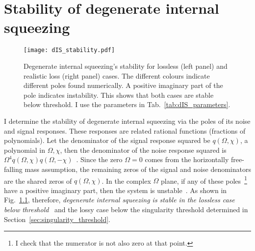 
\chapter{Stability of degenerate internal squeezing}
\label{app:dIS_stability}

\begin{figure}[ht]
    \centering
    \texttt{[image: dIS\_stability.pdf]}
    \caption{ Degenerate internal squeezing's stability for lossless (left panel) and realistic loss (right panel) cases. The different colours indicate different poles found numerically.
    A positive imaginary part of the pole indicates instability.
    This shows that both cases are stable below threshold. I use the parameters in Tab.~\ref{tab:dIS_parameters}.}
    \label{fig:dIS_stability}
\end{figure}

I determine the stability of degenerate internal squeezing via the poles of its noise and signal responses. These responses are related rational functions (fractions of polynomials). Let the denominator of the signal response squared be $q(\Omega,\chi)$, a polynomial in $\Omega,\chi$, then the denominator of the noise response squared is $\Omega^4 q(\Omega,\chi) q(\Omega,-\chi)$~\cite{korobkoQuantumExpanderGravitationalwave2019}. Since the zero $\Omega=0$ comes from the horizontally free-falling mass assumption, the remaining zeros of the signal and noise denominators are the shared zeros of $q(\Omega,\chi)$. In the complex $\Omega$ plane, if any of these poles~\footnote{I check that the numerator is not also zero at that point.} have a positive imaginary part, then the system is unstable~\cite{}. %
As shown in Fig.~\ref{fig:dIS_stability}, therefore, \emph{degenerate internal squeezing is stable in the lossless case below threshold}~\cite{} and the lossy case below the singularity threshold determined in Section~\ref{sec:singularity_threshold}.



